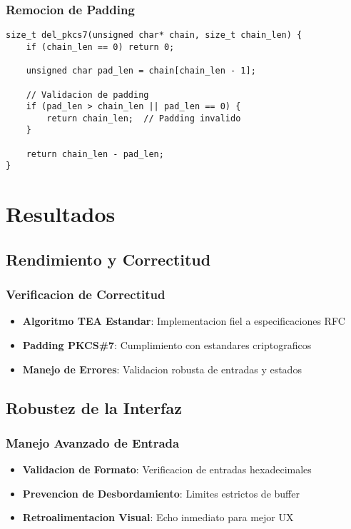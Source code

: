 \documentclass[12pt,a4paper]{article}
\begin{document}
\subsubsection{Remocion de Padding}
\begin{lstlisting}[caption=Eliminacion de Padding]
size_t del_pkcs7(unsigned char* chain, size_t chain_len) {
    if (chain_len == 0) return 0;
    
    unsigned char pad_len = chain[chain_len - 1];
    
    // Validacion de padding
    if (pad_len > chain_len || pad_len == 0) {
        return chain_len;  // Padding invalido
    }
    
    return chain_len - pad_len;
}
\end{lstlisting}

\section{Resultados}

\subsection{Rendimiento y Correctitud}

\subsubsection{Verificacion de Correctitud}
\begin{itemize}
\item \textbf{Algoritmo TEA Estandar}: Implementacion fiel a especificaciones RFC
\item \textbf{Padding PKCS\#7}: Cumplimiento con estandares criptograficos
\item \textbf{Manejo de Errores}: Validacion robusta de entradas y estados
\end{itemize}

\subsection{Robustez de la Interfaz}

\subsubsection{Manejo Avanzado de Entrada}
\begin{itemize}
\item \textbf{Validacion de Formato}: Verificacion de entradas hexadecimales
\item \textbf{Prevencion de Desbordamiento}: Limites estrictos de buffer
\item \textbf{Retroalimentacion Visual}: Echo inmediato para mejor UX
\end{itemize}
\end{document}

